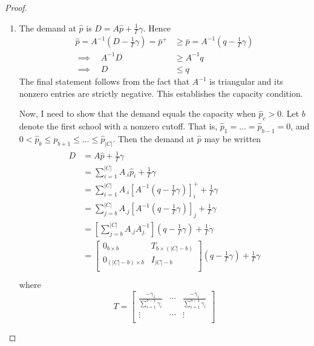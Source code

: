 \documentclass[12pt]{article}
\numberwithin{equation}{subsection}
\theoremstyle{definition}
\begin{document}
\begin{proof}
\begin{enumerate}
\item The demand at $\hat p$ is $D = A \hat p + \frac{1}{\Gamma}\gamma$. Hence
\begin{align*}
\hat p = A^{-1} (D - \frac{1}{\Gamma} \gamma) = \bar p^+ &\geq \bar p = A^{-1} (q - \frac{1}{\Gamma} \gamma) \\
\implies \quad A^{-1} D &\geq A^{-1} q \\
\implies \quad D &\leq q
\end{align*}
The final statement follows from the fact that $A^{-1}$ is triangular and its nonzero entries are strictly negative. This establishes the capacity condition. 

Now, I need to show that the demand equals the capacity when $\hat p_c > 0$. Let $b$ denote the first school with a nonzero cutoff. That is, $\hat p_1 = \dots = \hat p_{b-1} = 0$, and $0 < \hat p_b \leq p_{b+1} \leq \dots \leq \hat p_{|C|}$. Then the demand at $\hat p$ may be written
\begin{gather}\begin{aligned} \label{demandatphat}
D &= A \hat p + \frac{1}{\Gamma}\gamma \\
&= \sum_{i=1}^{|C|} A_{.i} \hat p_i + \frac{1}{\Gamma}\gamma  \\
&= \sum_{i=1}^{|C|} A_{.i} \left[A^{-1} \left(q - \frac{1}{\Gamma}\gamma\right) \right]_i^+ + \frac{1}{\Gamma}\gamma  \\
&= \sum_{j=b}^{|C|} A_{.j} \left[A^{-1} \left(q - \frac{1}{\Gamma}\gamma\right) \right]_j + \frac{1}{\Gamma}\gamma  \\
&= \left[\sum_{j=b}^{|C|} A_{.j} A_{j.}^{-1} \right] \left(q - \frac{1}{\Gamma}\gamma\right) + \frac{1}{\Gamma}\gamma  \\
&= \begin{bmatrix}
0_{b \times b} & T_{b \times (|C| - b)} \\
0_{(|C| - b) \times b} & I_{|C| - b} \\
\end{bmatrix} \left(q - \frac{1}{\Gamma}\gamma\right) + \frac{1}{\Gamma}\gamma  \\
\end{aligned}\end{gather}
where
\begin{equation} \label{Tdef}
T = \begin{bmatrix}
\frac{-\gamma_1}{\sum_{i=1}^{b-1} \gamma_i} & \cdots & \frac{-\gamma_1}{\sum_{i=1}^{b-1} \gamma_i} \\
\vdots & \cdots & \vdots \\

\end{bmatrix}
\end{equation}
\end{enumerate}
\end{proof}
\end{document}
